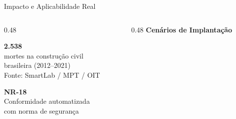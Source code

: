 \begin{frame}{Impacto e Aplicabilidade Real}
  \vspace{-1mm}

  \begin{columns}[c]
    \begin{column}{0.48\textwidth}
      \centering
      \colorbox{skipcolor!10}{%
        \parbox{0.88\textwidth}{\centering\vspace{2pt}
          {\fontsize{22}{24}\selectfont\textcolor{skipcolor}{\textbf{2.538}}}\\[1pt]
          {\footnotesize mortes na construção civil\\brasileira (2012--2021)}\\[1pt]
          {\tiny Fonte: SmartLab / MPT / OIT}
        \vspace{2pt}}%
      }

      \vspace{2mm}

      \colorbox{gridcolor!15}{%
        \parbox{0.88\textwidth}{\centering\vspace{2pt}
          {\small\textbf{NR-18}}\\[1pt]
          {\footnotesize Conformidade automatizada\\com norma de segurança}
        \vspace{2pt}}%
      }
    \end{column}
    \begin{column}{0.48\textwidth}
      \centering
      {\small\textbf{Cenários de Implantação}}

      \vspace{2mm}


\end{column}
\end{columns}
\end{frame}
